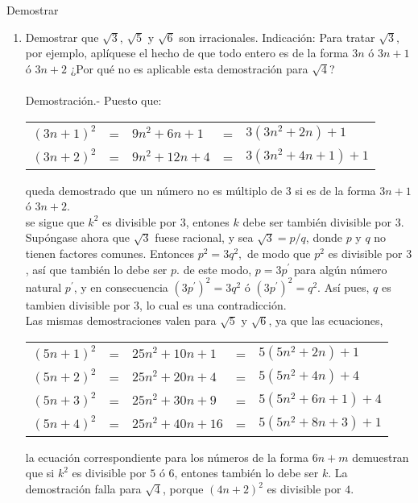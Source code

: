 \begin{teo}Demostrar
\begin{enumerate}[\bfseries a)]
\item Demostrar que $\sqrt{3}$, $\sqrt{5}$ y $\sqrt{6}$ son irracionales. Indicación: Para tratar $\sqrt{3},$ por ejemplo, aplíquese el hecho de que todo entero es de la forma $3n$ ó $3n+1$ ó $3n+2$ ¿Por qué no es aplicable esta demostración para $\sqrt{4}$?\\\\
Demostración.- \; Puesto que:
\begin{center}
\begin{tabular}{r c l c l}
$(3n+1)^2$&=&$9n^2 + 6n + 1$&=&$3(3n^2+2n) + 1$\\
$(3n+2)^2$&=&$9n^2+12n + 4$&=&$3(3n^2 + 4n + 1) + 1$\\
\end{tabular}
\end{center}
queda demostrado que un número no es múltiplo de $3$ si es de la forma $3n+1$ ó $3n+2$.\\
se sigue que $k^2$ es divisible por $3$, entones $k$ debe ser también divisible por $3$. Supóngase ahora que $\sqrt{3}$ fuese racional, y sea $\sqrt{3} = p/q$, donde $p$ \; y \; $q$ no tienen factores comunes. Entonces $p^2=3q^2,$ de modo que $p^2$ es divisible por $3$, así que también lo debe ser $p$. de este modo, $p=3p^{'}$ para algún número natural $p^{'}$, y en consecuencia $(3p^{'})^2 = 3q^2$ ó $(3p^{'})^2 = q^2.$ Así pues, $q$ es tambien divisible por $3$, lo cual es una contradicción.\\
Las mismas demostraciones valen para $\sqrt{5}$ y $\sqrt{6}$, ya que las ecuaciones,
\begin{center}
\begin{tabular}{rclcl}
$(5n+1)^2$&=&$25n^2 + 10n + 1$&=&$5(5n^2 + 2n)+1$\\
$(5n+2)^2$&=&$25n^2 + 20n + 4$&=&$5(5n^2 + 4n)+4$\\
$(5n+3)^2$&=&$25n^2 + 30n + 9$&=&$5(5n^2 + 6n + 1)+4$\\
$(5n+4)^2$&=&$25n^2 + 40n + 16$&=&$5(5n^2+8n+3)+1$\\
\end{tabular}
\end{center}
la ecuación correspondiente para los números de la forma $6n+m$ demuestran que si $k^2$ es divisible por $5$ ó $6$, entones también lo debe ser $k$. La demostración falla para $\sqrt{4}$, porque $(4n+2)^2$ es divisible por $4$.\\\\


\end{enumerate}
\end{teo}
